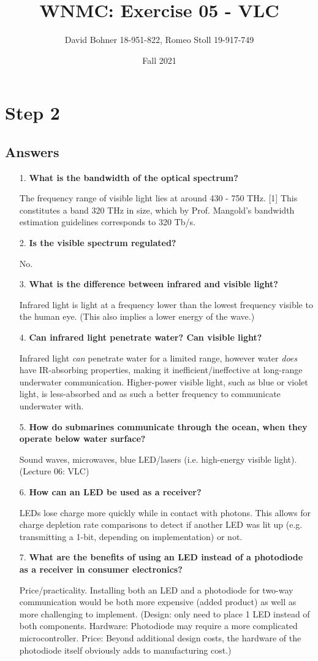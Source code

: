 \documentclass[12pt,a4paper]{article}
\author{David Bohner 18-951-822, Romeo Stoll 19-917-749}
\title{WNMC: Exercise 05 - VLC}
\date{Fall 2021}
\newcommand{\listedsection}[1]{\section*{#1}\addcontentsline{toc}{section}{#1}}
\newcommand{\listedsubsection}[1]{\subsection*{#1}\addcontentsline{toc}{subsection}{#1}}
\begin{document}
\maketitle
\tableofcontents
\newpage

\listedsection{Step 2}
\listedsubsection{Answers}
\begin{itemize}
\item[1.] \textbf{What is the bandwidth of the optical spectrum?}
\item[] The frequency range of visible light lies at around 430 - 750 THz. [1] This constitutes a band 320 THz in size, which by Prof. Mangold's bandwidth estimation guidelines corresponds to 320 Tb/s.
\item[2.] \textbf{Is the visible spectrum regulated?}
\item[] No.
\item[3.] \textbf{What is the difference between infrared and visible light?}
\item[] Infrared light is light at a frequency lower than the lowest frequency visible to the human eye. (This also implies a lower energy of the wave.)
\item[4.] \textbf{Can infrared light penetrate water? Can visible light?}
\item[] Infrared light \textit{can} penetrate water for a limited range, however water \textit{does} have IR-absorbing properties, making it inefficient/ineffective at long-range underwater communication. Higher-power visible light, such as blue or violet light, is less-absorbed and as such a better frequency to communicate underwater with.
\item[5.] \textbf{How do submarines communicate through the ocean, when they operate below water surface?}
\item[] Sound waves, microwaves, blue LED/lasers (i.e. high-energy visible light). (Lecture 06: VLC)
\item[6.] \textbf{How can an LED be used as a receiver?}
\item[] LEDs lose charge more quickly while in contact with photons. This allows for charge depletion rate comparisons to detect if another LED was lit up (e.g. transmitting a 1-bit, depending on implementation) or not.
\item[7.] \textbf{What are the benefits of using an LED instead of a photodiode as a receiver in consumer electronics?}
\item[] Price/practicality. Installing both an LED and a photodiode for two-way communication would be both more expensive (added product) as well as more challenging to implement. (Design: only need to place 1 LED instead of both components. Hardware: Photodiode may require a more complicated microcontroller. Price: Beyond additional design costs, the hardware of the photodiode itself obviously adds to manufacturing cost.)

\end{itemize}
\end{document}
